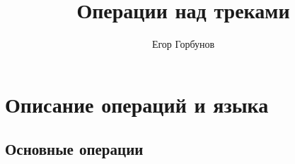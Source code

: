 

\newcommand{\kw}[1]{\text{\textbf{\color{blue}{#1}}}}


\title{Операции над треками}
\author{Егор Горбунов}


\maketitle

\section*{Описание операций и языка}

\subsection*{Основные операции}

